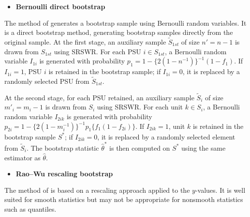 \begin{itemize}
\tightlist
\item
  \textbf{Bernoulli direct bootstrap}
\end{itemize}

\noindent The method of \citet{Funaoka:Saigo:Sitter:Toida:2006} generates a bootstrap sample using Bernoulli random variables. It is a direct bootstrap method, generating bootstrap samples directly from the original sample. At the first stage, an auxiliary sample \(\tilde{\textrm{$S$}}_{1st}\) of size \(n' = n-1\) is drawn from \(\textrm{$S$}_{1st}\) using SRSWR. For each PSU \(i \in \textrm{$S$}_{1st}\), a Bernoulli random variable \(I_{1i}\) is generated with probability \(p_1 = 1-\{2(1-n^{-1})\}^{-1} (1-f_1)\). If \(I_{1i} = 1\), PSU \(i\) is retained in the bootstrap sample; if \(I_{1i} = 0\), it is replaced by a randomly selected PSU from \(\tilde{\textrm{$S$}}_{1st}\).

At the second stage, for each PSU retained, an auxiliary sample \(\tilde{\textrm{$S$}}_i\) of size \(m'_i = m_i - 1\) is drawn from \(\textrm{$S$}_i\) using SRSWR. For each unit \(k \in \textrm{$S$}_i\), a Bernoulli random variable \(I_{2ik}\) is generated with probability \(p_{2i} = 1- \{ 2(1-m_i^{-1}) \}^{-1} p_1 \{ f_1(1-f_{2i}) \}\). If \(I_{2ik} = 1\), unit \(k\) is retained in the bootstrap sample \(\textrm{$S$}^*\); if \(I_{2ik} = 0\), it is replaced by a randomly selected element from \(\tilde{\textrm{$S$}}_i\). The bootstrap statistic \(\hat{\theta}^*\) is then computed on \(\textrm{$S$}^*\) using the same estimator as \(\hat{\theta}\).

\begin{itemize}
\tightlist
\item
  \textbf{Rao--Wu rescaling bootstrap}
\end{itemize}

\noindent The method of \citet{Rao:Wu:1988} is based on a rescaling approach applied to the \(y\)-values. It is well suited for smooth statistics but may not be appropriate for nonsmooth statistics such as quantiles.

